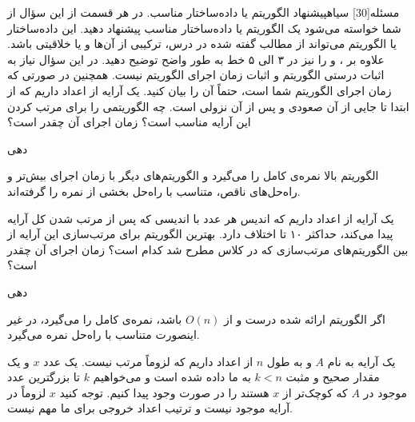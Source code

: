 ‌مسئله[30] ‌سیاه{پیشنهاد الگوریتم یا داده‌ساختار مناسب}. در هر قسمت از این سؤال از شما خواسته می‌شود یک الگوریتم یا داده‌ساختار مناسب پیشنهاد دهید. این داده‌ساختار یا الگوریتم می‌تواند از مطالب گفته شده در درس، ترکیبی از آن‌ها و یا خلاقیتی باشد. علاوه بر ،  و  را نیز در ۳ الی ۵ خط به طور واضح توضیح دهید. در این سؤال نیاز به اثبات درستی الگوریتم و اثبات زمان اجرای الگوریتم نیست. همچنین در صورتی که زمان اجرای الگوریتم شما  است، حتماً آن را بیان کنید.
یک آرایه از اعداد داریم که از ابتدا تا جایی از آن صعودی و پس از آن نزولی است. چه الگوریتمی را برای مرتب کردن این آرایه مناسب است؟ زمان اجرای آن چقدر است؟

‌دهی{
	الگوریتم بالا نمره‌ی کامل را می‌گیرد و الگوریتم‌های دیگر با زمان اجرای بیش‌تر و راه‌حل‌های ناقص، متناسب با راه‌حل بخشی از نمره را گرفته‌اند.
	
}

یک آرایه از اعداد داریم که اندیس هر عدد با اندیسی که پس از مرتب شدن کل آرایه پیدا می‌کند، حداکثر ۱۰ تا اختلاف دارد. بهترین الگوریتم برای مرتب‌سازی این آرایه از بین الگوریتم‌های مرتب‌سازی که در کلاس مطرح شد کدام است؟ زمان اجرای آن چقدر است؟

‌دهی{
	اگر الگوریتم ارائه شده درست و از 
	$O(n)$
	باشد، نمره‌ی کامل را می‌گیرد، در غیر اینصورت متناسب با راه‌حل نمره می‌گیرد.
	
}

یک آرایه به نام $A$ و به طول $n$ از اعداد داریم که لزوماً مرتب نیست. یک عدد $x$ و یک مقدار صحیح و مثبت $k<n$ به ما داده شده است و می‌خواهیم $k$ تا بزرگترین عدد موجود در $A$ که کوچک‌تر از $x$ هستند را در صورت وجود پیدا کنیم. توجه کنید $x$ لزوماً در آرایه موجود نیست و ترتیب اعداد خروجی برای ما مهم نیست.

